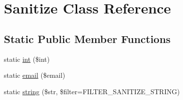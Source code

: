 \hypertarget{classapp_1_1models_1_1core_1_1_sanitize}{\section{Sanitize Class Reference}
\label{classapp_1_1models_1_1core_1_1_sanitize}
}
\subsection*{Static Public Member Functions}
\begin{DoxyCompactItemize}
\item 
static \hyperlink{classapp_1_1models_1_1core_1_1_sanitize_ae6281ac863d5c339ccdcdfc5a73d00cf}{int} (\$int)
\item 
static \hyperlink{classapp_1_1models_1_1core_1_1_sanitize_a985a50af0e155106b0860778e7c1dba1}{email} (\$email)
\item 
static \hyperlink{classapp_1_1models_1_1core_1_1_sanitize_aabf06a7faa0da754611fbaff12122efe}{string} (\$str, \$filter=F\-I\-L\-T\-E\-R\-\_\-\-S\-A\-N\-I\-T\-I\-Z\-E\-\_\-\-S\-T\-R\-I\-N\-G)
\end{DoxyCompactItemize}


